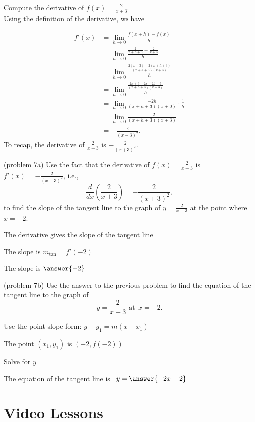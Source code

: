 \documentclass[handout]{ximera}
\begin{document}
\begin{example}[example 7]
Compute the derivative of $f(x) = \displaystyle{\frac{2}{x+3}}$.\\
Using the definition of the derivative, we have

\begin{align*}
f'(x) &= \lim_{h \to 0} \frac{f(x+h)-f(x)}{h}\\[5pt]
&= \lim_{h \to 0} \frac{\frac{2}{x+h +3}- \frac{2}{x+3}}{h}\\[5pt]
&= \lim_{h \to 0} \frac{\frac{2(x+3) - 2(x+h+3)}{(x+h+3)(x+3)}}{h} \\[5pt]
&= \lim_{h \to 0} \frac{\frac{2x+6 - 2x-2h-6}{(x+h+3)(x+3)}}{h} \\[5pt]
&=  \lim_{h \to 0} \frac{-2h}{(x+h+3)(x+3)}\cdot \frac{1}{h}\\[5pt]
&= \lim_{h \to 0} \frac{-2}{(x+h+3)(x+3)} \\[5pt]
&= -\frac{2}{(x+3)^2}.
\end{align*}
To recap, the derivative of $\displaystyle{\frac{2}{x+3}}$ is $\displaystyle{-\frac{2}{(x+3)^2}}$.
\end{example}




\begin{problem}(problem 7a)
Use the fact that the derivative of $f(x) = \frac{2}{x+3}$ is $f'(x) = -\frac{2}{(x+3)^2}$,
i.e., 
\[
\frac{d}{dx}\left(\frac{2}{x+3}\right) = -\frac{2}{(x+3)^2},
\]
to find the slope of the tangent line to the graph of 
$y = \frac{2}{x+3}$ at the point where $x = -2$.\\
\begin{hint}
The derivative gives the slope of the tangent line
\end{hint}
\begin{hint}
The slope is $m_{\text{tan}} = f'(-2)$
\end{hint}
The slope is $\answer{-2}$
\end{problem}




\begin{problem}(problem 7b)
Use the answer to the previous problem to find the equation of the tangent line to the graph of 
\[
y = \frac{2}{x+3} \  \  \text{at} \  \ x=-2.
\]

\begin{hint}
Use the point slope form: $y-y_1 = m(x-x_1)$
\end{hint}
\begin{hint}
The point $(x_1,y_1)$ is $(-2, f(-2))$
\end{hint}
\begin{hint}
Solve for $y$
\end{hint}
The equation of the tangent line is \  $y = \answer{-2x-2}$
\end{problem}






\section{Video Lessons}

\begin{center}
\begin{foldable}
\end{foldable}
\end{center}
\end{document}
